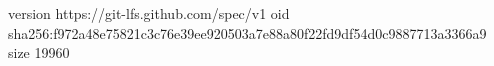 version https://git-lfs.github.com/spec/v1
oid sha256:f972a48e75821c3c76e39ee920503a7e88a80f22fd9df54d0c9887713a3366a9
size 19960
